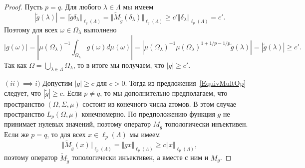 \begin{proof}
Пусть $p=q$. Для любого $\lambda\in\Lambda$ мы имеем
$$
|\widetilde{g}(\lambda)|
=\Vert \widetilde{g} \delta_\lambda\Vert_{\ell_q(\Lambda)}
=\Vert \widetilde{M}_{\widetilde{g}}(\delta_\lambda)\Vert_{\ell_q(\Lambda)}
\geq c'\Vert \delta_\lambda\Vert_{\ell_p(\Lambda)}
=c'.
$$
Поэтому для всех $\omega\in\Omega_\lambda$ выполнено
$$
|g(\omega)|
=\left|{\mu(\Omega_\lambda)}^{-1}
\int_{\Omega_\lambda}g(\omega)d\mu(\omega)\right|
=\left|{\mu(\Omega_\lambda)}^{-1}{\mu(\Omega_\lambda)}^{1+1/p-1/p}
\widetilde{g}(\lambda)\right|
=|\widetilde{g}(\lambda)|\geq c'.
$$
Так как $\Omega=\bigcup_{\lambda\in\Lambda}\Omega_\lambda$, то в итоге мы
получаем, что $|g|\geq c'$.

$(ii) \implies i)$ Допустим $|g|\geq c$ для $c>0$. Тогда из
предложения~\ref{EquivMultOp} следует, что $|\widetilde{g}|\geq c$. Если 
$p\neq q$, то мы дополнительно предполагаем, 
что пространство $(\Omega,\Sigma,\mu)$ состоит из конечного числа атомов. 
В этом случае пространство $L_p(\Omega,\mu)$
конечномерно. По предположению функция $g$ не принимает нулевых значений,
поэтому оператор $M_g$ топологически инъективен. Если же $p=q$, то для всех
$x\in\ell_p(\Lambda)$ мы имеем
$$
\Vert \widetilde{M}_{\widetilde{g}}(x)\Vert_{\ell_p(\Lambda)}
=\Vert g x\Vert_{\ell_p(\Lambda)}\geq c\Vert x\Vert_{\ell_p(\Lambda)},
$$
поэтому оператор $\widetilde{M}_{\widetilde{g}}$ топологически инъективен, а
вместе с ним и $M_g$.
\end{proof}

